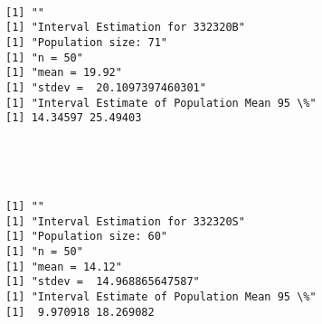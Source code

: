\documentclass[11pt]{article}
\begin{document}
    \begin{center}
    \end{center}
    { \hspace*{\fill} \\}
    
    \begin{Verbatim}[commandchars=\\\{\}]
[1] ""
[1] "Interval Estimation for 332320B"
[1] "Population size: 71"
[1] "n = 50"
[1] "mean = 19.92"
[1] "stdev =  20.1097397460301"
[1] "Interval Estimate of Population Mean 95 \%"
[1] 14.34597 25.49403

    \end{Verbatim}

    \begin{center}
    \end{center}
    { \hspace*{\fill} \\}
    
    \begin{center}
    \end{center}
    { \hspace*{\fill} \\}
    
    \begin{Verbatim}[commandchars=\\\{\}]
[1] ""
[1] "Interval Estimation for 332320S"
[1] "Population size: 60"
[1] "n = 50"
[1] "mean = 14.12"
[1] "stdev =  14.968865647587"
[1] "Interval Estimate of Population Mean 95 \%"
[1]  9.970918 18.269082

    \end{Verbatim}

    \begin{center}
    \end{center}
    { \hspace*{\fill} \\}
    
    \begin{center}
    \end{center}
    { \hspace*{\fill} \\}
    
\end{document}
